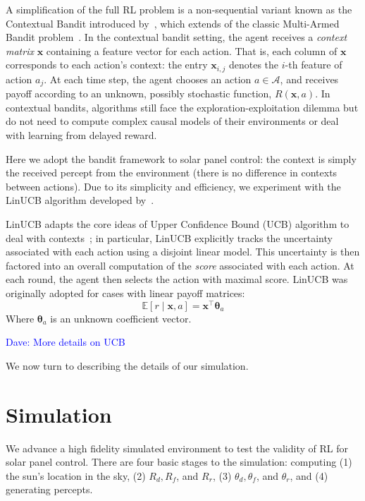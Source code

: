 \documentclass{article}
\newcommand{\dnote}[1]{\textcolor{blue}{Dave: #1}}
\newcommand{\mc}{\mathcal}
\begin{document}
A simplification of the full RL problem is a non-sequential variant known as the Contextual Bandit introduced by~\citet{wang2005bandit}, which extends of the classic Multi-Armed Bandit problem~\cite{gittins1979bandit}. In the contextual bandit setting, the agent receives a {\it context matrix} $\bm{x}$ containing a feature vector for each action. That is, each column of $\bm{x}$ corresponds to each action's context: the entry $\bm{x}_{i,j}$ denotes the $i$-th feature of action $a_j$. At each time step, the agent chooses an action $a \in \mc{A}$, and receives payoff according to an unknown, possibly stochastic function, $R(\bm{x},a)$. In contextual bandits, algorithms still face the exploration-exploitation dilemma but do not need to compute complex causal models of their environments or deal with learning from delayed reward.

Here we adopt the bandit framework to solar panel control: the context is simply the received percept from the environment (there is no difference in contexts between actions). Due to its simplicity and efficiency, we experiment with the LinUCB algorithm developed by~\citet{li2010contextual}.

LinUCB adapts the core ideas of Upper Confidence Bound (UCB) algorithm to deal with contexts~\cite{auer2002finite}; in particular, LinUCB explicitly tracks the uncertainty associated with each action using a disjoint linear model. This uncertainty is then factored into an overall computation of the {\it score} associated with each action. At each round, the agent then selects the action with maximal score. LinUCB was originally adopted for cases with linear payoff matrices:
\begin{equation}
\mathbb{E}\left[r \mid \bm{x}, a\right] = \bm{x}^\top \bm{\theta}_a
\end{equation}
Where $\bm{\theta}_a$ is an unknown coefficient vector. 

\dnote{More details on UCB}


We now turn to describing the details of our simulation.

\section{Simulation}
\label{sec:simulation}

We advance a high fidelity simulated environment to test the validity of RL for solar panel control. There are four basic stages to the simulation: computing (1) the sun's location in the sky, (2) $R_d, R_f$, and $R_r$, (3) $\theta_d, \theta_f$, and $\theta_r$, and (4) generating percepts.
\end{document}
